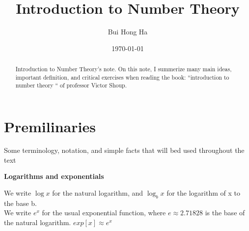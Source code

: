\documentclass [11pt]{article}
\title{Introduction to Number Theory}
\author{Bui Hong Ha}
\date{\today}
\begin{document}
\maketitle
\begin{abstract}
  Introduction to Number Theory's note. On this note, I summerize many main ideas, important definition, and critical exercises when reading the book: ``introduction to number theory `` of professor Victor Shoup.
\end{abstract}

\tableofcontents

\section{Premilinaries}
Some terminology, notation, and simple facts that will bed used throughout the text\\
\begin{center}
 \textbf{ Logarithms and exponentials}
\end{center}
We write $\log x$ for the natural logarithm, and $\log_b x $ for the logarithm of x to the base b.\\
We write $e^x$ for the usual exponential function, where $e \approx 2.71828 $ is the base of the natural logarithm. $ exp[x] \approx e^x $
\end{document}
